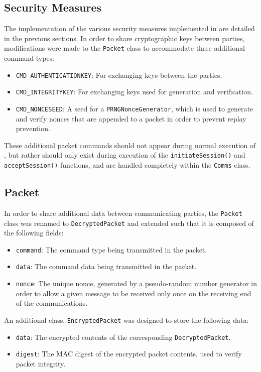 \documentclass[a4paper,11pt]{article}
\begin{document}
\subsection{Security Measures}
The implementation of the various security measures implemented in 
\packageName{} are detailed in the previous sections. In order to share
cryptographic keys between parties, modifications were made to the 
\packageName{} \verb+Packet+ class to accommodate three additional command types:
\begin{itemize}
\item \verb+CMD_AUTHENTICATIONKEY+: For exchanging  
keys between the parties.
\item \verb+CMD_INTEGRITYKEY+: For exchanging  keys used for
 generation and 
verification.
\item \verb+CMD_NONCESEED+: A seed for a \verb+PRNGNonceGenerator+, 
which is used to generate and verify nonces that are appended to a packet in 
order to prevent replay prevention.
\end{itemize}

These additional packet commands should not appear during normal execution of 
\serviceName{}, but rather should only exist during execution of the
\verb+initiateSession()+ and \verb+acceptSession()+ functions, and are handled 
completely within the \verb+Comms+ class.

\subsection{Packet}
In order to share additional data between communicating parties, the 
\serviceName{} \verb+Packet+ class was renamed to \verb+DecryptedPacket+ and 
extended such that it is composed of the following fields:
\begin{itemize}
\item \verb+command+: The command type being transmitted in the 
packet.
\item \verb+data+: The command data being transmitted in the packet.
\item \verb+nonce+: The unique nonce, generated by a pseudo-random number 
generator in order to allow a given message to be received only once on the 
receiving end of the communications.
\end{itemize}

An additional class, \verb+EncryptedPacket+ was designed to store the following
data:
\begin{itemize}
\item \verb+data+: The encrypted contents of the corresponding 
\verb+DecryptedPacket+.
\item \verb+digest+: The MAC digest of the encrypted packet contents, used to 
verify packet integrity.
\end{itemize}
\end{document}
